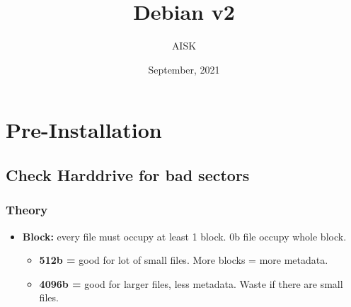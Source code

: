 \documentclass[10pt, a4paper, onecolumn, openany]{book} %
\title{\textbf{Debian v2}}
\author{AISK}
\date{September, 2021}
\begin{document}
\maketitle
\tableofcontents

\chapter{Pre-Installation}
\section{Check Harddrive for bad sectors}
\subsection{Theory}
\begin{itemize}
    \item \textbf{Block:} every file must occupy at least 1 block. 0b file occupy whole block.
    \begin{itemize}
        \item \textbf{512b =} good for lot of small files. More blocks = more metadata.
        \item \textbf{4096b =}  good for larger files, less metadata. Waste if there are small files.
    \end{itemize}
\end{itemize}
\end{document}

